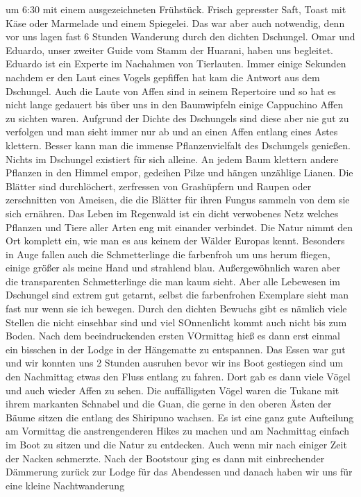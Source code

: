 \documentclass[11pt]{book}
\begin{document}
um 6:30 mit einem ausgezeichneten Frühstück. Frisch gepresster Saft, Toast mit Käse oder Marmelade und einem Spiegelei. Das war aber auch notwendig, denn vor 
uns lagen fast 6 Stunden Wanderung durch den dichten Dschungel. Omar und Eduardo, unser zweiter Guide vom Stamm der Huarani, haben uns begleitet. Eduardo 
ist ein Experte im Nachahmen von Tierlauten. Immer einige Sekunden nachdem er den Laut eines Vogels gepfiffen hat kam die Antwort aus dem Dschungel. Auch 
die Laute von Affen sind in seinem Repertoire und so hat es nicht lange gedauert bis über uns in den Baumwipfeln einige Cappuchino Affen zu sichten waren. 
Aufgrund der Dichte des Dschungels sind diese aber nie gut zu verfolgen und man sieht immer nur ab und an einen Affen entlang eines Astes klettern. 
Besser kann man die immense Pflanzenvielfalt des Dschungels genießen. Nichts im Dschungel existiert für sich alleine. An jedem Baum klettern andere 
Pflanzen in den Himmel empor, gedeihen Pilze und hängen unzählige Lianen. Die Blätter sind durchlöchert, zerfressen von Grashüpfern und Raupen oder 
zerschnitten von Ameisen, die die Blätter für ihren Fungus sammeln von dem sie sich ernähren. Das Leben im Regenwald ist ein dicht verwobenes Netz welches 
Pflanzen und Tiere aller Arten eng mit einander verbindet. Die Natur nimmt den Ort komplett ein, wie man es aus keinem der Wälder Europas kennt. Besonders 
in Auge fallen auch die Schmetterlinge die farbenfroh um uns herum fliegen, einige größer als meine Hand und strahlend blau. Außergewöhnlich waren 
aber die transparenten Schmetterlinge die man kaum sieht. Aber alle Lebewesen im Dschungel sind extrem gut getarnt, selbst die farbenfrohen Exemplare 
sieht man fast nur wenn sie ich bewegen. Durch den dichten Bewuchs gibt es nämlich viele Stellen die nicht einsehbar sind und viel SOnnenlicht kommt 
auch nicht bis zum Boden. 
Nach dem beeindruckenden ersten VOrmittag hieß es dann erst einmal ein bisschen in der Lodge in der Hängematte zu entspannen. Das Essen war gut und 
wir konnten uns 2 Stunden ausruhen bevor wir ins Boot gestiegen sind um den Nachmittag etwas den Fluss entlang zu fahren. Dort gab es dann viele Vögel 
und auch wieder Affen zu sehen. Die auffälligsten Vögel waren die Tukane mit ihrem markanten Schnabel und die Guan, die gerne in den oberen Ästen der 
Bäume sitzen die entlang des Shiripuno wachsen. Es ist eine ganz gute Aufteilung am Vormittag die anstrengenderen Hikes zu machen und am Nachmittag 
einfach im Boot zu sitzen und die Natur zu entdecken. Auch wenn mir nach einiger Zeit der Nacken schmerzte. 
Nach der Bootstour ging es dann mit einbrechender Dämmerung zurück zur Lodge für das Abendessen und danach haben wir uns für eine kleine Nachtwanderung 
\end{document}
